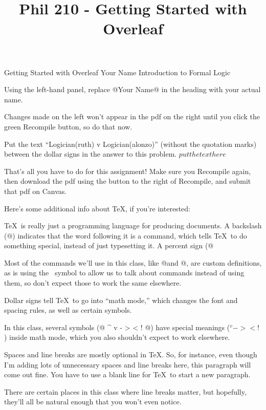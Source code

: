 %
%

\title{Phil 210 - Getting Started with Overleaf}

\heading
Getting Started with Overleaf
Your Name
Introduction to Formal Logic
\endheading

\problems
{}
Using the left-hand panel, replace @Your Name@ in the heading with your actual name.

Changes made on the left won't appear in the pdf on the right until you click the green Recompile button, so do that now.

Put the text ``Logician(ruth) v Logician(alonzo)'' (without the quotation marks) between the dollar signs in the answer to this problem.
	\answer
	$ put the text here $
	\endanswer

That's all you have to do for this assignment! Make sure you Recompile again, then download the pdf using the button to the right of Recompile, and submit that pdf on Canvas.

\endproblems


Here's some additional info about \TeX, if you're interested:

\parskip\baselineskip \parindent\problemindent

\TeX\ is really just a programming language for producing documents. A backslash (@\@) indicates that the word following it is a command, which tells \TeX\ to do something special, instead of just typesetting it. A percent sign (@%

Most of the commands we'll use in this class, like @\heading@ and @\endanswer@, are custom definitions, as is using the \at\ symbol to allow us to talk about commands instead of using them, so don't expect those to work the same elsewhere.

Dollar signs tell \TeX\ to go into ``math mode,'' which changes the font and spacing rules, as well as certain symbols.

In this class, several symbols (@ ^ v - > < ! @) have special meanings ($ ^ v - > < ! $) inside math mode, which you also shouldn't expect to work elsewhere.

Spaces and line breaks are mostly optional in \TeX. So, for instance,
even though
I'm adding   lots   of unnecessary spaces  and line
breaks
here, this paragraph   will come out  fine. You have    to use a blank line for \TeX\ to start a new paragraph.

There are certain places in this class where line breaks matter, but hopefully, they'll all be natural enough that you won't even notice.
\bye
